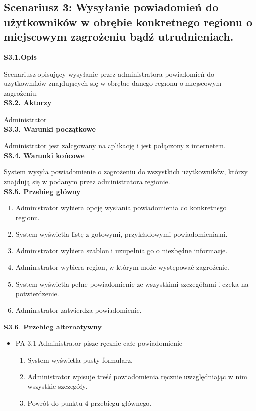     \subsection*{Scenariusz 3: Wysyłanie powiadomień do użytkowników w obrębie konkretnego regionu o miejscowym zagrożeniu bądź utrudnieniach.} 
    \noindent
    \textbf{S3.1.Opis} \par
    Scenariusz opisujący wysyłanie przez administratora powiadomień do użytkowników znajdujących się w obrębie danego regionu o miejscowym zagrożeniu. \\
    \textbf{S3.2. Aktorzy} \par
    Administrator \\
    \textbf{S3.3. Warunki początkowe} \par
    Administrator jest zalogowany na aplikację i jest połączony z internetem. \\
    \textbf{S3.4. Warunki końcowe} \par
    System wysyła powiadomienie o zagrożeniu do wszystkich użytkowników, którzy znajdują się w podanym przez administratora regionie. \\
    \textbf{S3.5. Przebieg główny} \par
    \begin{enumerate}
        \item  Administrator wybiera opcję wysłania powiadomienia do konkretnego regionu.
        \item System wyświetla listę z gotowymi, przykładowymi powiadomieniami.
        \item Administrator wybiera szablon i uzupełnia go o niezbędne informacje.
        \item Administrator wybiera region, w którym może występować zagrożenie.
        \item System wyświetla pełne powiadomienie ze wszystkimi szczegółami i czeka na potwierdzenie.
        \item Administrator zatwierdza powiadomienie.
    \end{enumerate}
    \textbf{S3.6. Przebieg alternatywny} \par
    \begin{itemize}
        \item []PA 3.1 Administrator pisze ręcznie całe powiadomienie.
        \begin{enumerate}
            \item System wyświetla pusty formularz.
            \item Administrator wpisuje treść powiadomienia ręcznie uwzględniając w nim wszystkie szczegóły.
            \item Powrót do punktu 4 przebiegu głównego.
        \end{enumerate}
    \end{itemize}

